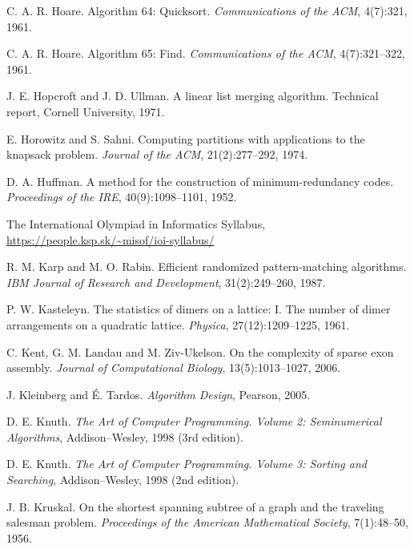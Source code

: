 \begin{thebibliography}{9}
    C. A. R. Hoare.
    Algorithm 64: Quicksort.
    \emph{Communications of the ACM}, 4(7):321, 1961.

    C. A. R. Hoare.
    Algorithm 65: Find.
    \emph{Communications of the ACM}, 4(7):321--322, 1961.

    J. E. Hopcroft and J. D. Ullman.
    A linear list merging algorithm.
    Technical report, Cornell University, 1971.

    E. Horowitz and S. Sahni.
    Computing partitions with applications to the knapsack problem.
    \emph{Journal of the ACM}, 21(2):277--292, 1974.

    D. A. Huffman.
    A method for the construction of minimum-redundancy codes.
    \emph{Proceedings of the IRE}, 40(9):1098--1101, 1952.

    The International Olympiad in Informatics Syllabus,
    \url{https://people.ksp.sk/~misof/ioi-syllabus/}

    R. M. Karp and M. O. Rabin.
    Efficient randomized pattern-matching algorithms.
    \emph{IBM Journal of Research and Development}, 31(2):249--260, 1987.

    P. W. Kasteleyn.
    The statistics of dimers on a lattice: I. The number of dimer arrangements on a quadratic lattice.
    \emph{Physica}, 27(12):1209--1225, 1961.

    C. Kent, G. M. Landau and M. Ziv-Ukelson.
    On the complexity of sparse exon assembly.
    \emph{Journal of Computational Biology}, 13(5):1013--1027, 2006.


    J. Kleinberg and É. Tardos.
    \emph{Algorithm Design}, Pearson, 2005.

    D. E. Knuth.
    \emph{The Art of Computer Programming. Volume 2: Seminumerical Algorithms}, Addison--Wesley, 1998 (3rd edition).

    D. E. Knuth.
    \emph{The Art of Computer Programming. Volume 3: Sorting and Searching}, Addison--Wesley, 1998 (2nd edition).


    J. B. Kruskal.
    On the shortest spanning subtree of a graph and the traveling salesman problem.
    \emph{Proceedings of the American Mathematical Society}, 7(1):48--50, 1956.


\end{thebibliography}
